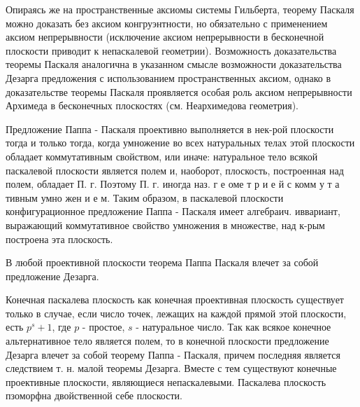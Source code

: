 \documentclass[10pt]{article}
\begin{document}
Опираясь же на пространственные аксиомы системы Гильберта, теорему Паскаля можно доказать без аксиом конгруэнтности, но обязательно с применением аксиом непрерывности (исключение аксиом непрерывности в бесконечной плоскости приводит к непаскалевой геометрии). Возможность доказательства теоремы Паскаля аналогична в указанном смысле возможности доказательства Дезарга предложения с использованием пространственных аксиом, однако в доказательстве теоремы Паскаля проявляется особая роль аксиом непрерывности Архимеда в бесконечных плоскостях (см. Неархимедова геометрия).

Предложение Паппа - Паскаля проективно выполняется в нек-рой плоскости тогда и только тогда, когда умножение во всех натуральных телах этой плоскости обладает коммутативным свойством, или иначе: натуральное тело всякой паскалевой плоскости является полем и, наоборот, плоскость, построенная над полем, обладает П. г. Поэтому П. г. иногда наз. г е оме т р и е й с комм у т а тивным умно жен и е м. Таким образом, в паскалевой плоскости конфигурационное предложение Паппа - Паскаля имеет алгебраич. иввариант, выражающий коммутативное свойство умножения в множестве, над к-рым построена эта плоскость.

В любой проективной плоскости теорема Паппа Паскаля влечет за собой предложение Дезарга.

Конечная паскалева плоскость как конечная проективная плоскость существует только в случае, если число точек, лежащих на каждой прямой этой плоскости, есть $p^{s}+1$, где $p$ - простое, $s$ - натуральное число. Так как всякое конечное альтернативное тело является полем, то в конечной плоскости предложение Дезарга влечет за собой теорему Паппа - Паскаля, причем последняя является следствием т. н. малой теоремы Дезарга. Вместе с тем существуют конечные проективные плоскости, являющиеся непаскалевыми. Паскалева плоскость пзоморфна двойственной себе плоскости.
\end{document}
